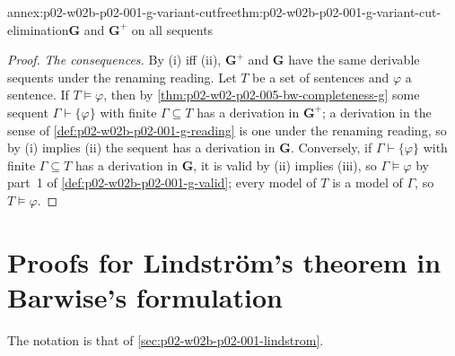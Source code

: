 \begin{annexitem}{annex:p02-w02b-p02-001-g-variant-cutfree}{thm:p02-w02b-p02-001-g-variant-cut-elimination}{\(\mathbf G\) and \(\mathbf G^{+}\) on all sequents}
\begin{proof}
\emph{The consequences.}  By (i) iff (ii), \(\mathbf G^{+}\) and
\(\mathbf G\) have the same derivable sequents under the renaming reading.
Let \(T\) be a set of sentences and \(\varphi\) a sentence.  If
\(T\models\varphi\), then by \cref{thm:p02-w02-p02-005-bw-completeness-g}
some sequent \(\Gamma\vdash\{\varphi\}\) with finite \(\Gamma\subseteq T\)
has a derivation in \(\mathbf G^{+}\); a derivation in the sense of
\cref{def:p02-w02b-p02-001-g-reading} is one under the renaming reading,
so by (i) implies (ii) the sequent has a derivation in \(\mathbf G\).
Conversely, if \(\Gamma\vdash\{\varphi\}\) with finite \(\Gamma\subseteq T\)
has a derivation in \(\mathbf G\), it is valid by (ii) implies (iii), so
\(\Gamma\models\varphi\) by part~1 of
\cref{def:p02-w02b-p02-001-g-valid}; every model of \(T\) is a model of
\(\Gamma\), so \(T\models\varphi\).
\end{proof}
\end{annexitem}

\section{Proofs for Lindstr\"om's theorem in Barwise's formulation}
\label{sec:annex-p02-w02b-p02-001-lindstrom}

The notation is that of \cref{sec:p02-w02b-p02-001-lindstrom}.

